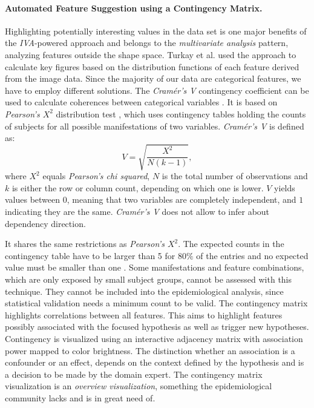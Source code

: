 \documentclass[journal]{style/vgtc} 			          %
\newcommand{\rem}[1]{\textcolor{red}{\sout{#1}}}
\begin{document}
\paragraph{Automated Feature Suggestion using a Contingency Matrix.}
Highlighting potentially interesting values in the data set is one major benefits of the \emph{IVA}-powered approach and belongs to the \emph{multivariate analysis} pattern,  analyzing features outside the shape space.
%
Turkay et al. \cite{Turkay2013} used the approach to calculate key figures based on the distribution functions of each feature derived from the image data.
%
Since the majority of our data are categorical features, we have to employ different solutions.
%
The \emph{Cram\'{e}r's V} contingency coefficient can be used to calculate coherences between categorical variables \cite{CramerV}.
%
It is based on \emph{Pearson's $X^2$} distribution test \cite{ChiSquare}, which uses contingency tables holding the counts of subjects for all possible manifestations of two variables.
%
\emph{Cram\'{e}r's V} is defined as:
\begin{equation}
V = \sqrt{\frac{X^2}{N(k-1)}},
\end{equation}
where $X^2$ equals \emph{Pearson's chi squared}, $N$ is the total number of observations and $k$ is either the row or column count, depending on which one is lower.
%
$V$ yields values between $0$, meaning that two variables are completely independent, and $1$ indicating they are the same.
%
\emph{Cram\'{e}r's V} does not allow to infer about dependency direction.
%

It shares the same restrictions as \emph{Pearson's $X^2$}.
%
The expected counts in the contingency table have to be larger than 5 for $80\%$ of the entries and no expected value must be smaller than one \cite{Cochran1952}.
%
Some manifestations and feature combinations, which are only exposed by small subject groups, cannot be assessed with this technique.
%
They cannot be included into the epidemiological analysis, since statistical validation needs a minimum count to be valid.
%
The contingency matrix highlights correlations between all features. %
%
This aims to highlight features possibly associated with the focused hypothesis as well as trigger new hypotheses.
%
Contingency is visualized using an interactive adjacency matrix with association power mapped to color brightness.
%
The distinction whether an association is a confounder or an effect, depends on the context defined by the hypothesis and is a decision to be made by the domain expert.
%
The contingency matrix visualization is an \emph{overview visualization}, something the epidemiological community lacks and is in great need of.
\end{document}
